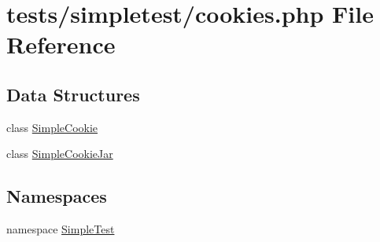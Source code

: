 \hypertarget{cookies_8php}{\section{tests/simpletest/cookies.php File Reference}
\label{cookies_8php}
}
\subsection*{Data Structures}
\begin{DoxyCompactItemize}
\item 
class \hyperlink{class_simple_cookie}{Simple\-Cookie}
\item 
class \hyperlink{class_simple_cookie_jar}{Simple\-Cookie\-Jar}
\end{DoxyCompactItemize}
\subsection*{Namespaces}
\begin{DoxyCompactItemize}
\item 
namespace \hyperlink{namespace_simple_test}{Simple\-Test}
\end{DoxyCompactItemize}
